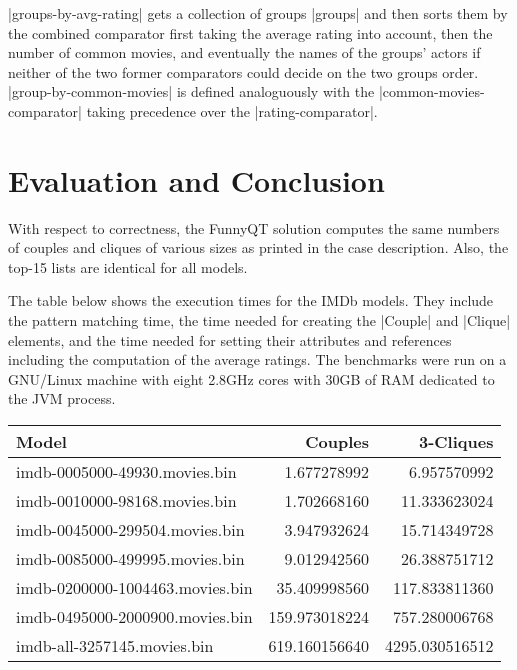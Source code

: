 \documentclass[submission]{eptcs}
\newcommand{\code}{\clojureinline}
\begin{document}
\code|groups-by-avg-rating| gets a collection of groups \code|groups| and then
sorts them by the combined comparator first taking the average rating into
account, then the number of common movies, and eventually the names of the
groups' actors if neither of the two former comparators could decide on the two
groups order.  \code|group-by-common-movies| is defined analoguously with the
\code|common-movies-comparator| taking precedence over the
\code|rating-comparator|.


\section{Evaluation and Conclusion}
\label{sec:evaluation}

With respect to correctness, the FunnyQT solution computes the same numbers of
couples and cliques of various sizes as printed in the case description.  Also,
the top-15 lists are identical for all models.

The table below shows the execution times for the IMDb models.  They include
the pattern matching time, the time needed for creating the \code|Couple| and
\code|Clique| elements, and the time needed for setting their attributes and
references including the computation of the average ratings.  The benchmarks
were run on a GNU/Linux machine with eight 2.8GHz cores with 30GB of RAM
dedicated to the JVM process.

{\footnotesize
  \begin{center}
    \begin{tabular}{| l | r | r |}
      \hline
      \textbf{Model}                  & \textbf{Couples} & \textbf{3-Cliques}\\
      \hline
      imdb-0005000-49930.movies.bin   &   1.677278992    &        6.957570992\\
      imdb-0010000-98168.movies.bin   &   1.702668160    &        11.333623024\\
      imdb-0045000-299504.movies.bin  &   3.947932624    &        15.714349728\\
      imdb-0085000-499995.movies.bin  &   9.012942560    &        26.388751712\\
      imdb-0200000-1004463.movies.bin &   35.409998560   &        117.833811360\\
      imdb-0495000-2000900.movies.bin &   159.973018224  &        757.280006768\\
      imdb-all-3257145.movies.bin     &   619.160156640  &        4295.030516512\\
      \hline
    \end{tabular}
  \end{center}}
\end{document}
